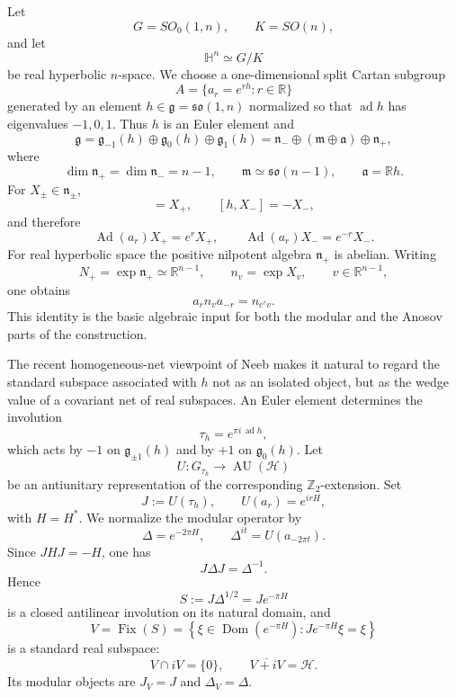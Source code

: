\documentclass[a4paper,11pt]{article}
\theoremstyle{definition}
\newcommand{\cH}{\mathcal{H}}
\newcommand{\Ad}{\operatorname{Ad}}
\newcommand{\Dom}{\operatorname{Dom}}
\begin{document}
Let
\[
G=SO_0(1,n),\qquad K=SO(n),
\]
and let
\[
\mathbb H^n\simeq G/K
\]
be real hyperbolic \(n\)-space.  We choose a one-dimensional split Cartan subgroup
\[
A=\{a_r=e^{rh}:r\in\mathbb R\}
\]
generated by an element \(h\in\mathfrak g=\mathfrak{so}(1,n)\) normalized so that
\(\operatorname{ad}h\) has eigenvalues \(-1,0,1\).  Thus \(h\) is an Euler element and
\[
\mathfrak g
=
\mathfrak g_{-1}(h)\oplus \mathfrak g_0(h)\oplus \mathfrak g_1(h)
=
\mathfrak n_-\oplus(\mathfrak m\oplus\mathfrak a)\oplus\mathfrak n_+,
\]
where
\[
\dim \mathfrak n_+=\dim\mathfrak n_-=n-1,\qquad
\mathfrak m\simeq\mathfrak{so}(n-1),\qquad
\mathfrak a=\mathbb Rh.
\]
For \(X_\pm\in\mathfrak n_\pm\),
\begin{equation}
[h,X_+]=X_+,\qquad [h,X_-]=-X_-,
\end{equation}
and therefore
\begin{equation}
\Ad(a_r)X_+=e^rX_+,\qquad
\Ad(a_r)X_-=e^{-r}X_-.
\label{eq:root-scaling}
\end{equation}
For real hyperbolic space the positive nilpotent algebra \(\mathfrak n_+\) is abelian.
Writing
\[
N_+=\exp\mathfrak n_+\simeq\mathbb R^{n-1},
\qquad
n_v=\exp X_v,\qquad v\in\mathbb R^{n-1},
\]
one obtains
\begin{equation}
a_r n_v a_{-r}=n_{e^rv}.
\label{eq:horospherical-dilation}
\end{equation}
This identity is the basic algebraic input for both the modular and the Anosov parts of
the construction.

The recent homogeneous-net viewpoint of Neeb makes it natural to regard the standard
subspace associated with \(h\) not as an isolated object, but as the wedge value of a
covariant net of real subspaces.  An Euler element determines the involution
\[
\tau_h=e^{\pi i\,\operatorname{ad}h},
\]
which acts by \(-1\) on \(\mathfrak g_{\pm1}(h)\) and by \(+1\) on
\(\mathfrak g_0(h)\).  Let
\[
U:G_{\tau_h}\longrightarrow \operatorname{AU}(\cH)
\]
be an antiunitary representation of the corresponding \(\mathbb Z_2\)-extension.
Set
\[
J:=U(\tau_h),
\qquad
U(a_r)=e^{irH},
\]
with \(H=H^*\).  We normalize the modular operator by
\begin{equation}
\Delta=e^{-2\pi H},
\qquad
\Delta^{it}=U(a_{-2\pi t}).
\label{eq:modular-boost}
\end{equation}
Since \(JHJ=-H\), one has
\[
J\Delta J=\Delta^{-1}.
\]
Hence
\[
S:=J\Delta^{1/2}=Je^{-\pi H}
\]
is a closed antilinear involution on its natural domain, and
\begin{equation}
V
=
\operatorname{Fix}(S)
=
\left\{
\xi\in\Dom(e^{-\pi H}):Je^{-\pi H}\xi=\xi
\right\}
\label{eq:standard-subspace}
\end{equation}
is a standard real subspace:
\[
V\cap iV=\{0\},\qquad \overline{V+iV}=\cH.
\]
Its modular objects are \(J_V=J\) and \(\Delta_V=\Delta\).
\end{document}
